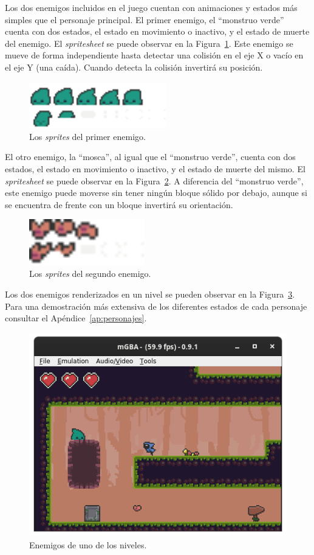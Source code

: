 Los dos enemigos incluidos en el juego cuentan con animaciones y estados más simples que el personaje principal. El primer enemigo, el ``monstruo verde'' cuenta con dos estados, el estado en movimiento o inactivo, y el estado de muerte del enemigo. El \textit{spritesheet} se puede observar en la Figura~\ref{fig:slime}. Este enemigo se mueve de forma independiente hasta detectar una colisión en el eje X o vacío en el eje Y (una caída). Cuando detecta la colisión invertirá su posición.

\begin{figure}[h]
	\centering
	\includegraphics[height=2cm]{capitulos/capitulo6/slime.png}
	\caption{Los \textit{sprites} del primer enemigo.}\label{fig:slime}
\end{figure}

El otro enemigo, la ``mosca'', al igual que el ``monstruo verde'', cuenta con dos estados, el estado en movimiento o inactivo, y el estado de muerte del mismo. El \textit{spritesheet} se puede observar en la Figura~\ref{fig:fly}. A diferencia del ``monstruo verde'', este enemigo puede moverse sin tener ningún bloque sólido por debajo, aunque si se encuentra de frente con un bloque invertirá su orientación.

\begin{figure}[h]
	\centering
	\includegraphics[height=2cm]{capitulos/capitulo6/fly.png}
	\caption{Los \textit{sprites} del segundo enemigo.}\label{fig:fly}
\end{figure}

Los dos enemigos renderizados en un nivel se pueden observar en la Figura~\ref{fig:enemies}. Para una demostración más extensiva de los diferentes estados de cada personaje consultar el Apéndice~\ref{ap:personajes}.

\begin{figure}[h]
	\centering
	\includegraphics[width=.7\textwidth]{capitulos/capitulo6/enemies.png}
	\caption{Enemigos de uno de los niveles.}\label{fig:enemies}
\end{figure}

